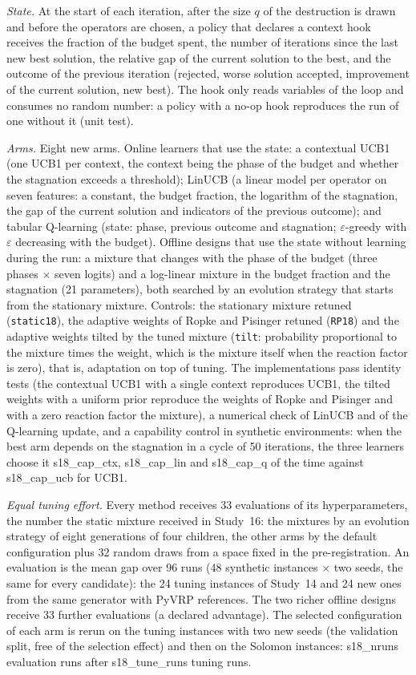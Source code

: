 \emph{State.} At the start of each iteration, after the size $q$ of the destruction is drawn and before the operators are chosen, a policy that declares a context hook receives the fraction of the budget spent, the number of iterations since the last new best solution, the relative gap of the current solution to the best, and the outcome of the previous iteration (rejected, worse solution accepted, improvement of the current solution, new best). The hook only reads variables of the loop and consumes no random number: a policy with a no-op hook reproduces the run of one without it (unit test).

\emph{Arms.} Eight new arms. Online learners that use the state: a contextual UCB1 (one UCB1 per context, the context being the phase of the budget and whether the stagnation exceeds a threshold); LinUCB (a linear model per operator on seven features: a constant, the budget fraction, the logarithm of the stagnation, the gap of the current solution and indicators of the previous outcome); and tabular Q-learning (state: phase, previous outcome and stagnation; $\varepsilon$-greedy with $\varepsilon$ decreasing with the budget). Offline designs that use the state without learning during the run: a mixture that changes with the phase of the budget (three phases $\times$ seven logits) and a log-linear mixture in the budget fraction and the stagnation (21 parameters), both searched by an evolution strategy that starts from the stationary mixture. Controls: the stationary mixture retuned (\texttt{static18}), the adaptive weights of Ropke and Pisinger retuned (\texttt{RP18}) and the adaptive weights tilted by the tuned mixture (\texttt{tilt}: probability proportional to the mixture times the weight, which is the mixture itself when the reaction factor is zero), that is, adaptation on top of tuning. The implementations pass identity tests (the contextual UCB1 with a single context reproduces UCB1, the tilted weights with a uniform prior reproduce the weights of Ropke and Pisinger and with a zero reaction factor the mixture), a numerical check of LinUCB and of the Q-learning update, and a capability control in synthetic environments: when the best arm depends on the stagnation in a cycle of 50 iterations, the three learners choose it \num{s18_cap_ctx}, \num{s18_cap_lin} and \num{s18_cap_q} of the time against \num{s18_cap_ucb} for UCB1.

\emph{Equal tuning effort.} Every method receives 33 evaluations of its hyperparameters, the number the static mixture received in Study~16: the mixtures by an evolution strategy of eight generations of four children, the other arms by the default configuration plus 32 random draws from a space fixed in the pre-registration. An evaluation is the mean gap over 96 runs (48 synthetic instances $\times$ two seeds, the same for every candidate): the 24 tuning instances of Study~14 and 24 new ones from the same generator with PyVRP references. The two richer offline designs receive 33 further evaluations (a declared advantage). The selected configuration of each arm is rerun on the tuning instances with two new seeds (the validation split, free of the selection effect) and then on the Solomon instances: \num{s18_nruns} evaluation runs after \num{s18_tune_runs} tuning runs.

